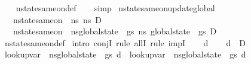 \begin{isabellebody}
%
\isadelimproof
\ \ %
\endisadelimproof
%
\isatagproof
{}\isamarkupfalse%
\ nstate{\isacharunderscore}{\kern0pt}same{\isacharunderscore}{\kern0pt}on{\isacharunderscore}{\kern0pt}def\isanewline
\ \ \isamarkupfalse%
\ simp%
\endisatagproof
{\isafoldproof}%
%
\isadelimproof
\isanewline
%
\endisadelimproof
\isanewline
{}\isamarkupfalse%
\ nstate{\isacharunderscore}{\kern0pt}same{\isacharunderscore}{\kern0pt}on{\isacharunderscore}{\kern0pt}update{\isacharunderscore}{\kern0pt}global{\isacharcolon}{\kern0pt}\isanewline
\ \ \ {\isachardoublequoteopen}nstate{\isacharunderscore}{\kern0pt}same{\isacharunderscore}{\kern0pt}on\ {\isasymLambda}\ ns{}\ ns{}\ D{\isachardoublequoteclose}\isanewline
\ \ \ {\isachardoublequoteopen}nstate{\isacharunderscore}{\kern0pt}same{\isacharunderscore}{\kern0pt}on\ {\isasymLambda}\ {\isacharparenleft}{\kern0pt}ns{}{\isasymlparr}global{\isacharunderscore}{\kern0pt}state\ {\isacharcolon}{\kern0pt}{\isacharequal}{\kern0pt}\ gs{\isasymrparr}{\isacharparenright}{\kern0pt}\ {\isacharparenleft}{\kern0pt}ns{}\ {\isasymlparr}global{\isacharunderscore}{\kern0pt}state\ {\isacharcolon}{\kern0pt}{\isacharequal}{\kern0pt}\ gs{\isasymrparr}{\isacharparenright}{\kern0pt}\ D{\isachardoublequoteclose}\ \ \isanewline
%
\isadelimproof
\ \ %
\endisadelimproof
%
\isatagproof
{}\isamarkupfalse%
\ nstate{\isacharunderscore}{\kern0pt}same{\isacharunderscore}{\kern0pt}on{\isacharunderscore}{\kern0pt}def\isanewline
{}\isamarkupfalse%
\ {\isacharparenleft}{\kern0pt}intro\ conjI{\isacharcomma}{\kern0pt}\ rule\ allI{\isacharcomma}{\kern0pt}\ rule\ impI{\isacharparenright}{\kern0pt}\isanewline
\ \ \isamarkupfalse%
\ d\isanewline
\ \ \isamarkupfalse%
\ {\isachardoublequoteopen}d\ {\isasymnotin}\ D{\isachardoublequoteclose}\isanewline
\ \ \isamarkupfalse%
\ {\isachardoublequoteopen}lookup{\isacharunderscore}{\kern0pt}var\ {\isasymLambda}\ {\isacharparenleft}{\kern0pt}ns{}{\isasymlparr}global{\isacharunderscore}{\kern0pt}state\ {\isacharcolon}{\kern0pt}{\isacharequal}{\kern0pt}\ gs{\isasymrparr}{\isacharparenright}{\kern0pt}\ d\ {\isacharequal}{\kern0pt}\ lookup{\isacharunderscore}{\kern0pt}var\ {\isasymLambda}\ {\isacharparenleft}{\kern0pt}ns{}{\isasymlparr}global{\isacharunderscore}{\kern0pt}state\ {\isacharcolon}{\kern0pt}{\isacharequal}{\kern0pt}\ gs{\isasymrparr}{\isacharparenright}{\kern0pt}\ d{\isachardoublequoteclose}\isanewline

\end{isabellebody}
